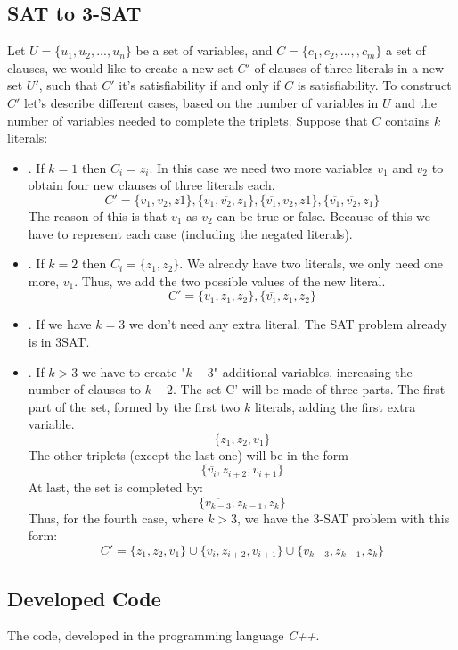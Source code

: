 \documentclass{article}
\begin{document}
\subsection{SAT to 3-SAT}
Let $ U = \{u_1, u_2,...,u_n\}$ be a set of variables, and $ C = \{c_1, c_2, ...,, c_m\}$ a set of clauses, we would like to create a new set $C'$ of clauses of three literals in a new set $U'$, such that $C'$ it's satisfiability if and only if $C$ is satisfiability.
To construct $C'$ let's describe different cases, based on the number of variables in $U$ and the number of variables needed to complete the triplets.
Suppose that $C$ contains $k$ literals:
\begin{itemize}
    \item {}. If $k=1$ then $C_i = z_i$. In this case we need two more variables $v_1$ and $v_2$ to obtain four new clauses of three literals each.
    $$ C' = \{v_1, v_2, z1\}, \{v_1, \overline {v_2}, z_1\}, \{\overline{v_1}, v_2, z1\}, \{\overline{v_1}, \overline{v_2}, z_1\} $$
    The reason of this is that $v_1$ as $v_2$ can be true or false. Because of this we have to represent each case (including the negated literals).
    \item {}. If $k=2$ then $C_i = \{z_1, z_2\}$. We already have two literals, we only need one more, $v_1$. Thus, we add the two possible values of the new literal.
        $$ C' = \{v_1, z_1, z_2\}, \{\overline{v_1}, z_1, z_2\}$$
    \item {}. If we have $k=3$ we don't need any extra literal. The SAT problem already is in 3SAT.
    \item {}. If $k>3$ we have to create "$k-3$" additional variables, increasing the number of clauses to $k-2$. The set C' will be made of three parts. The first part of the set, formed by the first two $k$ literals, adding the first extra variable.
        $$ \{z_1, z_2, v_1\}$$
    The other triplets (except the last one) will be in the form
    $$ \{\overline{v_i}, z_{i+2}, v_{i+1}\}$$
    At last, the set is completed by:
        $$ \{\overline{v_{k-3}}, z_{k-1}, z_k\}$$
    Thus, for the fourth case, where $k>3$, we have the 3-SAT problem with this form:
        $$ C' = \{z_1, z_2, v_1\} \cup \{\overline{v_i}, z_{i+2}, v_{i+1}\} \cup \{\overline{v_{k-3}}, z_{k-1}, z_k\}$$

\end{itemize}

\subsection{Developed Code}
The code, developed in the programming language \textit{C++}.
\end{document}
